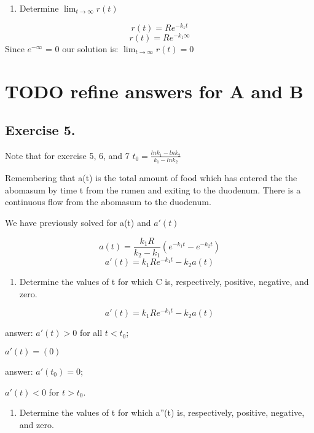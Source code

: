 \documentclass[]{article}
\providecommand{\tightlist}{%
  \setlength{\itemsep}{0pt}\setlength{\parskip}{0pt}}
\begin{document}
\begin{enumerate}
\def\labelenumi{(\alph{enumi})}
\setcounter{enumi}{2}
\tightlist
\item
  Determine \(\lim_{t\to\infty}r(t)\)
\end{enumerate}

\[r(t) = Re^{-k_1t}\] \[r(t) = Re^{-k_1 \infty}\] Since \(e^{-\infty}\)
= 0 our solution is: \(\lim_{t\to\infty}r(t) =0\)

\section{TODO refine answers for A and
B}\label{todo-refine-answers-for-a-and-b}

\subsection{Exercise 5.}\label{exercise-5.}

Note that for exercise 5, 6, and 7
\(t_0 = \frac{ln k_1 - ln k_2}{k_1 - lnk_2}\)

Remembering that a(t) is the total amount of food which has entered the
the abomasum by time t from the rumen and exiting to the duodenum. There
is a continuous flow from the abomasum to the duodenum.

We have previously solved for a(t) and \(a'(t)\)

\[a(t) = \frac{k_1 R}{k_2-k_1}(e^{-k_1t} - e^{-k_2t})\]
\[a'(t) = k_1Re^{-k_1t}-k_2a(t)\]

\begin{enumerate}
\def\labelenumi{(\alph{enumi})}
\tightlist
\item
  Determine the values of t for which C is, respectively, positive,
  negative, and zero.
\end{enumerate}

\[a'(t) = k_1Re^{-k_1t}-k_2a(t)\]

answer: \(a'(t) > 0\) for all \(t < t_0\);

\(a'(t) = (0)\)

answer: \(a'(t_0) = 0\);

\(a'(t) < 0\) for \(t > t_0\).

\begin{enumerate}
\def\labelenumi{(\alph{enumi})}
\setcounter{enumi}{1}
\tightlist
\item
  Determine the values of t for which a''(t) is, respectively, positive,
  negative, and zero.
\end{enumerate}
\end{document}
